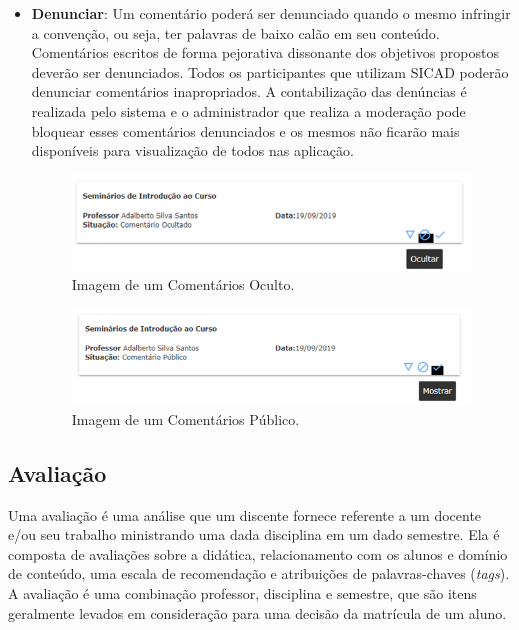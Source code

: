 \documentclass[12pt, a4paper]{report}
\begin{document}
\begin{itemize}
\item \textbf{Denunciar}: Um comentário poderá ser denunciado quando o mesmo infringir a convenção, ou seja, ter palavras de baixo calão em seu conteúdo. Comentários escritos de forma pejorativa dissonante dos objetivos propostos deverão ser denunciados. Todos os participantes que utilizam \ac{SICAD} poderão denunciar comentários inapropriados. A contabilização das denúncias é realizada pelo sistema e o administrador que realiza a moderação pode bloquear esses comentários denunciados e os mesmos não ficarão mais disponíveis para visualização de todos nas aplicação.

\begin{figure}
\centering
\includegraphics[scale=0.7]{comentario_oculto.png}
\caption{Imagem de um Comentários Oculto.}
\label{fig:comentario_oculto}
\end{figure}

\begin{figure}
\centering
\includegraphics[scale=0.7]{comentario_publico.png}
\caption{Imagem de um Comentários Público.}
\label{fig:comentario_publico}
\end{figure}



\end{itemize}
\subsection{Avaliação}

Uma avaliação é uma análise que um discente fornece referente a um docente e/ou seu trabalho ministrando uma dada disciplina em um dado semestre. Ela é composta de avaliações sobre a didática, relacionamento com os alunos e domínio de conteúdo, uma escala de recomendação e atribuições de palavras-chaves (\textit{tags}). A avaliação é uma combinação professor, disciplina e semestre, que são itens geralmente levados em consideração para uma decisão da matrícula de um aluno.
\end{document}
